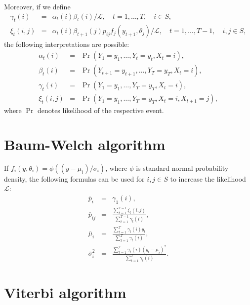 Moreover, if we define
\begin{eqnarray}
  \label{eq:gamma}
  \gamma_t(i) & = & \alpha_t(i)\beta_t(i) / \mathcal{L}, \hspace{1em} t
  = 1, \ldots, T, \hspace{1em} i \in S, \\
  \label{eq:xi}
  \xi_t(i, j) & = &
  \alpha_t(i)\beta_{t + 1}(j)p_{ij} f_j(y_{t + 1}, \theta_j) / \mathcal{L},
  \hspace{1em}
  t = 1, \ldots, T - 1, \hspace{1em} i, j \in S,
\end{eqnarray}
the following interpretations are possible:
\begin{eqnarray*}
  \alpha_t(i) & = & \Pr(Y_1 = y_1, \ldots, Y_t = y_t, X_t = i),
  \\ \beta_t(i) & = & \Pr(Y_{t + 1} = y_{t + 1}, \ldots, Y_T = y_T, X_t
  = i), \\
  \gamma_t(i) & = & \Pr(Y_1 = y_1, \ldots, Y_T = y_T, X_t = i), \\
  \xi_t(i, j) & = & \Pr(Y_1 = y_1, \ldots, Y_T = y_T, X_t = i,
  X_{t + 1} = j),
\end{eqnarray*}
where $\Pr$ denotes likelihood of the respective event.

\section{Baum-Welch algorithm}

If $f_i(y, \theta_i) = \phi((y - \mu_i) / \sigma_i)$, where $\phi$ is
standard normal probability density, the following formulas can be
used for $i, j \in S$ to increase the likelihood $\mathcal{L}$:
\begin{eqnarray}
  \label{eq:baumwelchp}
  \overline{p}_i & = & \gamma_1(i), \\
  \label{eq:baumwelchP}
  \overline{p}_{ij} & = & \frac{\sum_{t = 1}^{T - 1} \xi_t(i,
    j)}{\sum_{t = 1}^{T - 1} \gamma_t(i)}, \\
  \label{eq:baumwelchmu}
  \overline{\mu}_{i} & = & \frac{\sum_{t = 1}^T \gamma_t(i)y_t}{\sum_{t
      = 1}^T \gamma_t(i)}, \\
  \label{eq:baumwelchsigma}
  \overline{\sigma}_i^2 & = & \frac{\sum_{t = 1}^T \gamma_t(i)(y_t -
    \overline{\mu}_i)^2}{\sum_{t = 1}^T \gamma_t(i)}.
\end{eqnarray}

\section{Viterbi algorithm}

